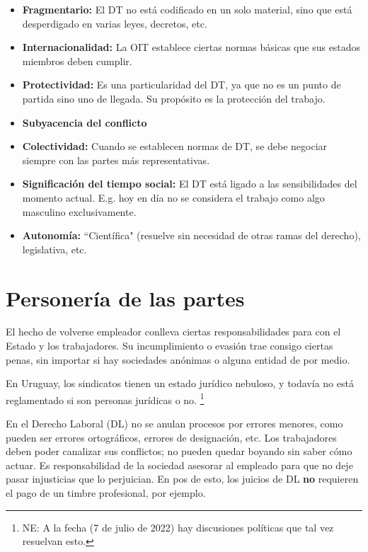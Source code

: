 \documentclass[../main.tex]{subfiles}
\begin{document}
\begin{itemize}

\item \textbf{Fragmentario:} El DT no está codificado en un solo material, sino que está desperdigado en varias leyes, decretos, etc.

\item \textbf{Internacionalidad:} La OIT establece ciertas normas básicas que sus estados miembros deben cumplir.

\item \textbf{Protectividad:} Es una particularidad del DT, ya que no es un punto de partida sino uno de llegada. Su propósito es la protección del trabajo.

\item \textbf{Subyacencia del conflicto}

\item \textbf{Colectividad:} Cuando se establecen normas de DT, se debe negociar siempre con las partes más representativas.

\item \textbf{Significación del tiempo social:} El DT está ligado a las sensibilidades del momento actual. E.g. hoy en día no se considera el trabajo como algo masculino exclusivamente.

\item \textbf{Autonomía:} ``Científica" (resuelve sin necesidad de otras ramas del derecho), legislativa, etc.

\end{itemize}

\section{Personería de las partes}

El hecho de volverse empleador conlleva ciertas responsabilidades para con el Estado y los trabajadores.
Su incumplimiento o evasión trae consigo ciertas penas, sin importar si hay sociedades anónimas o alguna entidad de por medio.

En Uruguay, los sindicatos tienen un estado jurídico nebuloso, y todavía no está reglamentado si son personas jurídicas o no.
\footnote{NE: A la fecha (7 de julio de 2022) hay discusiones políticas que tal vez resuelvan esto.}

En el Derecho Laboral (DL) no se anulan procesos por errores menores, como pueden ser errores ortográficos, errores de designación, etc.
Los trabajadores deben poder canalizar sus conflictos; no pueden quedar boyando sin saber cómo actuar.
Es responsabilidad de la sociedad asesorar al empleado para que no deje pasar injusticias que lo perjuician.
En pos de esto, los juicios de DL \textbf{no} requieren el pago de un timbre profesional, por ejemplo.
\end{document}
